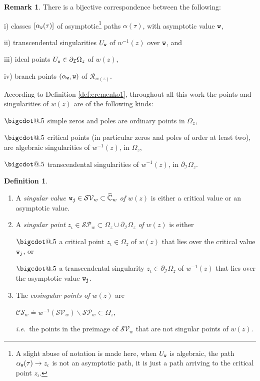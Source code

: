 \documentclass[final,3p,times]{elsarticle}
\makeatletter
\newcommand{\CW}{\ensuremath{{\widehat{\mathbb C}}}}
\newcommand{\R}{\ensuremath{{\mathcal R}}}
\newcommand*\bigcdot{\mathpalette\bigcdot@{.5}}
\newcommand*\bigcdot@[2]{\mathbin{\vcenter{\hbox{\scalebox{#2}{$\m@th#1\bullet$}}}}}
\theoremstyle{definition}
\newtheorem{definition}[theorem]{Definition}
\newtheorem{remark}[theorem]{Remark}
\makeatother
\begin{document}
\begin{remark}
\label{rem:correspondencia-caminos-asintoticos}
There is a bijective correspondence between 
the following:


\noindent
i) 
classes $[\alpha_{{\tt w}}( \tau )]$ 
of asymptotic\footnote{
A slight abuse of notation is made here, when $U_{{\tt w} }$ is algebraic, 
the path $\alpha_{{\tt w} }(\tau)\to z_{\iota}$ is not an asymptotic path, 
it is just a path arriving to the critical point $z_{\iota}$.
}  paths $\alpha( \tau )$, with asymptotic value ${\tt w}$,


\noindent
ii) transcendental singularities $U_{{\tt w} }$ 
of $w^{-1}(z)$ over ${\tt w}$, and

\noindent
iii) ideal points $U_{{\tt w} }\in\partial_{\mathcal{I}}\Omega_z$ of $w(z)$,

\noindent
iv) branch points $(\alpha_{{\tt w} }, {{\tt w} })$ of $\R_{w(z)}$.

\end{remark}
    

According to Definition \ref{def:eremenko1}, throughout
all this work the points and singularities of $w(z)$ are of the
following kinds:

\noindent 
$\bigcdot$
simple zeros and poles are ordinary points in $\Omega_z$,


\noindent 
$\bigcdot$
critical points (in particular 
zeros and poles of order at least two),  
are algebraic singularities of $w^{-1}(z)$, in $\Omega_z$,


\noindent 
$\bigcdot$
transcendental singularities of $w^{-1}(z)$,
in $\partial_{\mathcal{I}} \Omega_z$.


\begin{definition}
\label{def:singular-value-point-cosingular}
\
\begin{enumerate}[label=\arabic*),leftmargin=*] 
\item
A \emph{singular value ${\tt w}_{\tt j}\in \mathcal{SV}_w \subset \CW_w$ of $w(z)$} is either a critical value or an asymptotic value.


\item
A \emph{singular point }
$z_\iota \in \mathcal{SP}_w
\subset \Omega_z \cup \partial_{\mathcal{I}} \Omega_z$ 
\emph{of $w(z)$} is 
either 

\noindent
$\bigcdot$ 
a critical point $z_\iota \in \Omega_z$ of $w(z)$ that lies over the critical value ${\tt w}_{\tt j}$, or 

\noindent
$\bigcdot$ 
a transcendental singularity $z_\iota \in \partial_{\mathcal{I}} \Omega_z$ of $w^{-1}(z)$ that lies over the asymptotic value ${\tt w}_{\tt j}$.

\item 
The \emph{cosingular points of  $w(z)$} are

\centerline{
$\mathcal{CS}_w \doteq  w^{-1}(\mathcal{SV}_w)  \backslash \mathcal{SP}_w \subset \Omega_z$, 
}

\noindent
\emph{i.e.}\ 
the points in the preimage of $\mathcal{SV}_w$ that are not 
singular points of $w(z)$.
\end{enumerate}
\end{definition}
\end{document}
